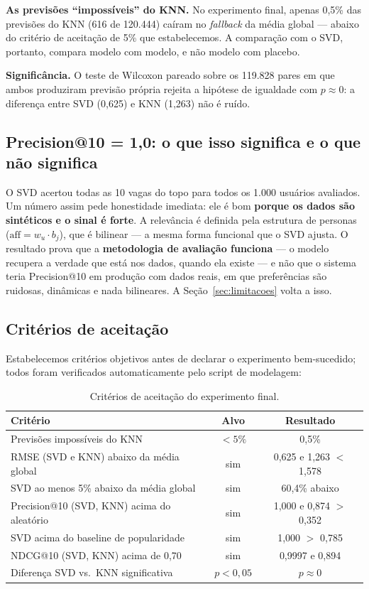 \documentclass[12pt,a4paper]{article}
\begin{document}
\textbf{As previsões ``impossíveis'' do KNN.} No experimento final, apenas 0,5\% das previsões do KNN (616 de 120.444) caíram no \textit{fallback} da média global --- abaixo do critério de aceitação de 5\% que estabelecemos. A comparação com o SVD, portanto, compara modelo com modelo, e não modelo com placebo.

\textbf{Significância.} O teste de Wilcoxon pareado sobre os 119.828 pares em que ambos produziram previsão própria rejeita a hipótese de igualdade com $p \approx 0$: a diferença entre SVD (0,625) e KNN (1,263) não é ruído.

\subsection{Precision@10 = 1,0: o que isso significa e o que não significa}

O SVD acertou todas as 10 vagas do topo para todos os 1.000 usuários avaliados. Um número assim pede honestidade imediata: ele é bom \textbf{porque os dados são sintéticos e o sinal é forte}. A relevância é definida pela estrutura de personas ($\text{aff} = w_u \cdot b_j$), que é bilinear --- a mesma forma funcional que o SVD ajusta. O resultado prova que a \textbf{metodologia de avaliação funciona} --- o modelo recupera a verdade que está nos dados, quando ela existe --- e não que o sistema teria Precision@10 em produção com dados reais, em que preferências são ruidosas, dinâmicas e nada bilineares. A Seção~\ref{sec:limitacoes} volta a isso.

\subsection{Critérios de aceitação}

Estabelecemos critérios objetivos antes de declarar o experimento bem-sucedido; todos foram verificados automaticamente pelo script de modelagem:

\begin{table}[H]
\centering
\caption{Critérios de aceitação do experimento final.}
\begin{tabular}{lcc}
\toprule
\textbf{Critério} & \textbf{Alvo} & \textbf{Resultado} \\
\midrule
Previsões impossíveis do KNN & $< 5\%$ & 0,5\% \\
RMSE (SVD e KNN) abaixo da média global & sim & 0,625 e 1,263 $<$ 1,578 \\
SVD ao menos 5\% abaixo da média global & sim & 60,4\% abaixo \\
Precision@10 (SVD, KNN) acima do aleatório & sim & 1,000 e 0,874 $>$ 0,352 \\
SVD acima do baseline de popularidade & sim & 1,000 $>$ 0,785 \\
NDCG@10 (SVD, KNN) acima de 0,70 & sim & 0,9997 e 0,894 \\
Diferença SVD vs.\ KNN significativa & $p < 0{,}05$ & $p \approx 0$ \\
\bottomrule
\end{tabular}
\end{table}
\end{document}
